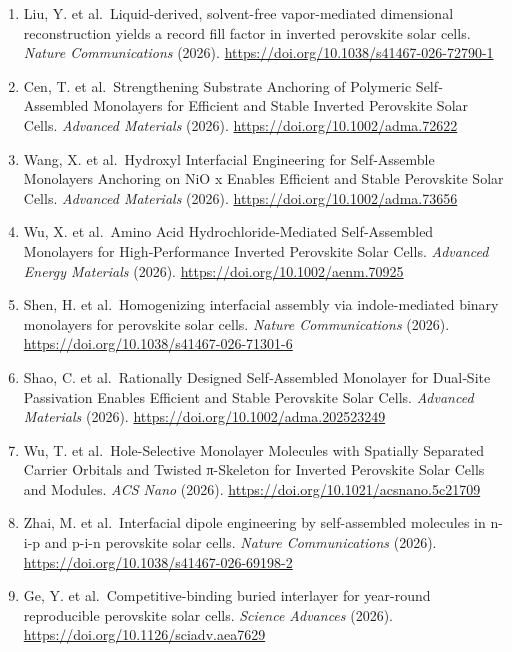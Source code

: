 \documentclass[
  11pt,
]{article}
\begin{document}
\begin{enumerate}
  Spacers via Hydrazide‐Induced Orbital Coupling in Ruddlesden‐Popper
  Perovskites. \emph{Angewandte Chemie International Edition} (2026).
  \url{https://doi.org/10.1002/anie.4293157}
\item
  Liu, Y. et al.~Liquid-derived, solvent-free vapor-mediated dimensional
  reconstruction yields a record fill factor in inverted perovskite
  solar cells. \emph{Nature Communications} (2026).
  \url{https://doi.org/10.1038/s41467-026-72790-1}
\item
  Cen, T. et al.~Strengthening Substrate Anchoring of Polymeric
  Self‐Assembled Monolayers for Efficient and Stable Inverted Perovskite
  Solar Cells. \emph{Advanced Materials} (2026).
  \url{https://doi.org/10.1002/adma.72622}
\item
  Wang, X. et al.~Hydroxyl Interfacial Engineering for Self‐Assemble
  Monolayers Anchoring on NiO x Enables Efficient and Stable Perovskite
  Solar Cells. \emph{Advanced Materials} (2026).
  \url{https://doi.org/10.1002/adma.73656}
\item
  Wu, X. et al.~Amino Acid Hydrochloride‐Mediated Self‐Assembled
  Monolayers for High‐Performance Inverted Perovskite Solar Cells.
  \emph{Advanced Energy Materials} (2026).
  \url{https://doi.org/10.1002/aenm.70925}
\item
  Shen, H. et al.~Homogenizing interfacial assembly via indole-mediated
  binary monolayers for perovskite solar cells. \emph{Nature
  Communications} (2026).
  \url{https://doi.org/10.1038/s41467-026-71301-6}
\item
  Shao, C. et al.~Rationally Designed Self‐Assembled Monolayer for
  Dual‐Site Passivation Enables Efficient and Stable Perovskite Solar
  Cells. \emph{Advanced Materials} (2026).
  \url{https://doi.org/10.1002/adma.202523249}
\item
  Wu, T. et al.~Hole-Selective Monolayer Molecules with Spatially
  Separated Carrier Orbitals and Twisted π-Skeleton for Inverted
  Perovskite Solar Cells and Modules. \emph{ACS Nano} (2026).
  \url{https://doi.org/10.1021/acsnano.5c21709}
\item
  Zhai, M. et al.~Interfacial dipole engineering by self-assembled
  molecules in n-i-p and p-i-n perovskite solar cells. \emph{Nature
  Communications} (2026).
  \url{https://doi.org/10.1038/s41467-026-69198-2}
\item
  Ge, Y. et al.~Competitive-binding buried interlayer for year-round
  reproducible perovskite solar cells. \emph{Science Advances} (2026).
  \url{https://doi.org/10.1126/sciadv.aea7629}

\end{enumerate}
\end{document}

